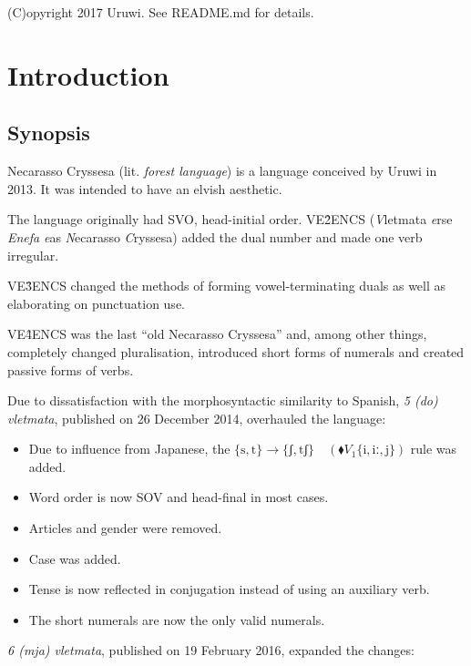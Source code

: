 \documentclass{book}
\begin{document}
(C)opyright 2017 Uruwi. See README.md for details.

\tableofcontents

\section{Introduction}

\subsection{Synopsis}

Necarasso Cryssesa (lit. \emph{forest language}) is a language conceived by Uruwi in 2013. It was intended to have an elvish aesthetic.

The language originally had SVO, head-initial order. VE\^2ENCS (\emph{V}letmata \emph{e}rse \emph{Enefa} \emph{e}as \emph{N}ecarasso \emph{C}ryssesa) added the dual number and made one verb irregular.

VE\^3ENCS changed the methods of forming vowel-terminating duals as well as elaborating on punctuation use.

VE\^4ENCS was the last ``old Necarasso Cryssesa'' and, among other things, completely changed pluralisation, introduced short forms of numerals and created passive forms of verbs.

Due to dissatisfaction with the morphosyntactic similarity to Spanish, \emph{5 (do) vletmata}, published on 26 December 2014, overhauled the language:

\begin{itemize}
  \item Due to influence from Japanese, the $\{\text{s}, \text{t}\} \rightarrow \{\text{ʃ}, \text{tʃ}\} \quad(\blacklozenge V_1\{\text{i}, \text{iː}, \text{j}\})$ rule was added.
  \item Word order is now SOV and head-final in most cases.
  \item Articles and gender were removed.
  \item Case was added.
  \item Tense is now reflected in conjugation instead of using an auxiliary verb.
  \item The short numerals are now the only valid numerals.
\end{itemize}

\emph{6 (mja) vletmata}, published on 19 February 2016, expanded the changes:
\end{document}

